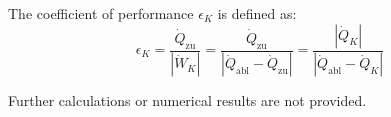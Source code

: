 The coefficient of performance \( \epsilon_K \) is defined as:  
\[
\epsilon_K = \frac{\dot{Q}_{\text{zu}}}{|\dot{W}_K|} = \frac{\dot{Q}_{\text{zu}}}{|\dot{Q}_{\text{abl}} - \dot{Q}_{\text{zu}}|} = \frac{|\dot{Q}_K|}{|\dot{Q}_{\text{abl}} - \dot{Q}_K|}
\]  

Further calculations or numerical results are not provided.